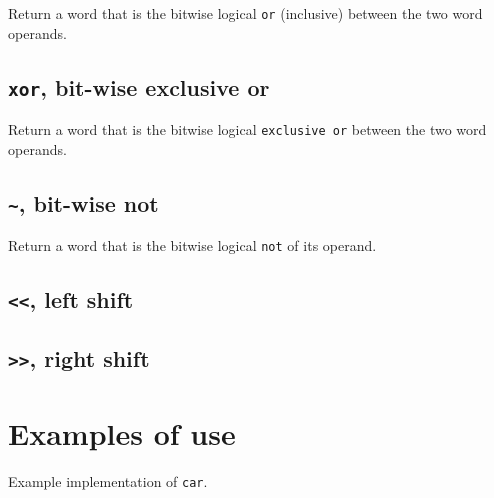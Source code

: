 Return a word that is the bitwise logical \texttt{or} (inclusive)
between the two word operands.

\subsection{\texttt{xor}, bit-wise exclusive or}

Return a word that is the bitwise logical \texttt{exclusive or}
between the two word operands.

\subsection{\texttt{\~}, bit-wise not}

Return a word that is the bitwise logical \texttt{not} of its operand.

\subsection{\texttt{<\thinspace <}, left shift}


\subsection{\texttt{>\thinspace >}, right shift}

\section{Examples of use}

\begin{codefragment}
\caption{\label{code-car-1}
Example implementation of \texttt{car}.}
\end{codefragment}
